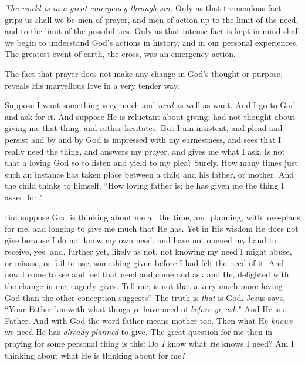 \textit{The world is in a great emergency through sin.} Only as that tremendous
fact grips us shall we be men of prayer, and men of action up to the limit
of the need, and to the limit of the possibilities. Only as that intense
fact is kept in mind shall we begin to understand God's actions in
history, and in our personal experiences. The greatest event of earth, the
cross, was an emergency action.

The fact that prayer does not make any change in God's thought or
purpose, reveals His marvellous love in a very tender way.

Suppose I want something very much and \textit{need} as well as want. And I go to
God and ask for it. And suppose He is reluctant about giving: had not
thought about giving me that thing; and rather hesitates. But I am
insistent, and plead and persist and by and by God is impressed with my
earnestness, and sees that I really need the thing, and answers my prayer,
and gives me what I ask. Is not that a loving God so to listen and yield
to my plea? Surely. How many times just such an instance has taken place
between a child and his father, or mother. And the child thinks to
himself, ``How loving father is; he has given me the thing I asked for."

But suppose God is thinking about me all the time, and planning, with
love-plans for me, and longing to give me much that He has. Yet in His
wisdom He does not give because I do not know my own need, and have not
opened my hand to receive, yes, and, further yet, likely as not, not
knowing my need I might abuse, or misuse, or fail to use, something given
before I had felt the need of it. And now I come to see and feel that need
and come and ask and He, delighted with the change in me, eagerly gives.
Tell me, is not that a very much more loving God than the other conception
suggests? The truth is \textit{that} is God. Jesus says, ``Your Father knoweth
what things ye have need of \textit{before ye ask}." And He is a Father. And
with God the word father means mother too. Then what He \textit{knows} we need He
has \textit{already planned} to give. The great question for me then in praying
for some personal thing is this: Do \textit{I} know what \textit{He} knows I need? Am I
thinking about what He is thinking about for me?

